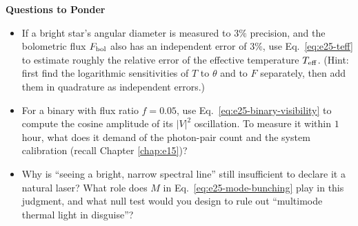\medskip
\noindent\textbf{Questions to Ponder}
\begin{itemize}
  \item If a bright star's angular diameter is measured to \(3\%\) precision, and the bolometric flux \(F_{\rm bol}\) also has an independent error of \(3\%\), use Eq.\ \eqref{eq:e25-teff} to estimate roughly the relative error of the effective temperature \(T_{\rm eff}\). (Hint: first find the logarithmic sensitivities of \(T\) to \(\theta\) and to \(F\) separately, then add them in quadrature as independent errors.)
  \item For a binary with flux ratio \(f=0.05\), use Eq.\ \eqref{eq:e25-binary-visibility} to compute the cosine amplitude of its \(|V|^2\) oscillation. To measure it within \(1\) hour, what does it demand of the photon-pair count and the system calibration (recall Chapter \ref{chap:e15})?
  \item Why is ``seeing a bright, narrow spectral line'' still insufficient to declare it a natural laser? What role does \(M\) in Eq.\ \eqref{eq:e25-mode-bunching} play in this judgment, and what null test would you design to rule out ``multimode thermal light in disguise''?
\end{itemize}
